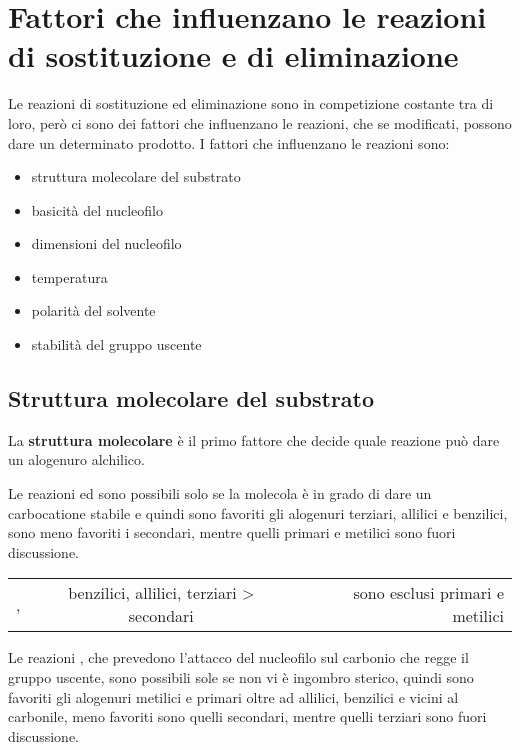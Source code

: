 \section{Fattori che influenzano le reazioni di sostituzione e di eliminazione}
Le reazioni di sostituzione ed eliminazione sono in competizione costante tra di loro, però ci sono dei fattori che influenzano le reazioni, che se modificati, possono dare un determinato prodotto. I fattori che influenzano le reazioni sono:
\begin{itemize}
	\item struttura molecolare del substrato
	\item basicità del nucleofilo
	\item dimensioni del nucleofilo
	\item temperatura
	\item polarità del solvente
	\item stabilità del gruppo uscente
\end{itemize}


\subsection*{Struttura molecolare del substrato}
La \textbf{struttura molecolare} è il primo fattore che decide quale reazione può dare un alogenuro alchilico.

Le reazioni \mech[e1] ed \mech[1] sono possibili solo se la molecola è in grado di dare un carbocatione stabile e quindi sono favoriti gli alogenuri terziari, allilici e benzilici, sono meno favoriti i secondari, mentre quelli primari e metilici sono fuori discussione.

\begin{center}
	\begin{tabular}{lcr}
		\mech[e1], \mech[1] & \qquad benzilici, allilici, terziari > secondari & \qquad sono esclusi primari e metilici \\
	\end{tabular}
\end{center}

Le reazioni \mech[2], che prevedono l’attacco del nucleofilo sul carbonio che regge il gruppo uscente, sono possibili sole se non vi è ingombro sterico, quindi sono favoriti gli alogenuri metilici e primari oltre ad allilici, benzilici e vicini al carbonile, meno favoriti sono quelli secondari, mentre quelli terziari sono fuori discussione.

